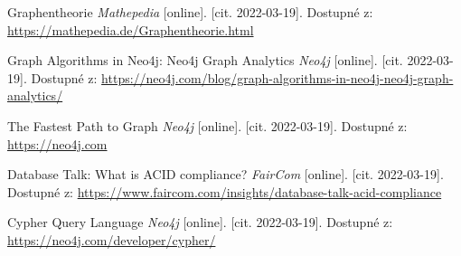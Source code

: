 \begin{thebibliography}{55}
    Graphentheorie \textit{Mathepedia} [online]. [cit. 2022-03-19]. Dostupné z: \url{https://mathepedia.de/Graphentheorie.html}
     
    
    Graph Algorithms in Neo4j: Neo4j Graph Analytics \textit{Neo4j} [online]. [cit. 2022-03-19]. Dostupné z: \url{https://neo4j.com/blog/graph-algorithms-in-neo4j-neo4j-graph-analytics/}
     
        
    The Fastest Path to Graph \textit{Neo4j} [online]. [cit. 2022-03-19]. Dostupné z: \url{https://neo4j.com}
            
    Database Talk: What is ACID compliance? \textit{FairCom} [online]. [cit. 2022-03-19]. Dostupné z: \url{https://www.faircom.com/insights/database-talk-acid-compliance}
     
                
    Cypher Query Language \textit{Neo4j} [online]. [cit. 2022-03-19]. Dostupné z: \url{https://neo4j.com/developer/cypher/}
     
    
    
    
\end{thebibliography}
